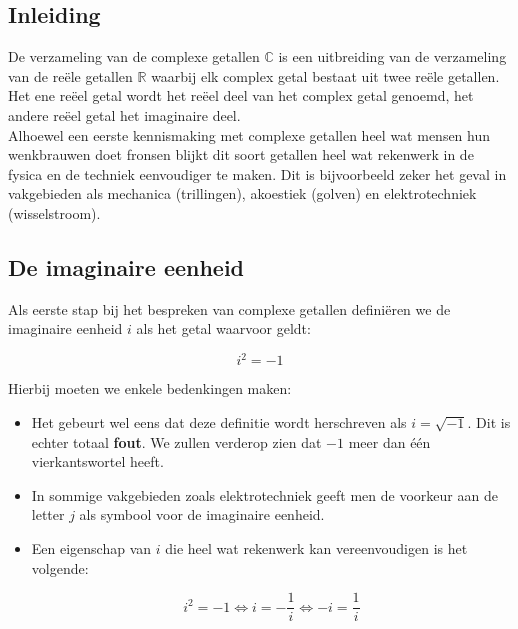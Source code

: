 
\subsection*{Inleiding}

De verzameling van de complexe getallen $\mathbb{C}$ is een uitbreiding van de verzameling van de re\"{e}le getallen $\mathbb{R}$ waarbij elk complex getal bestaat uit twee re\"{e}le getallen. Het ene re\"{e}el getal wordt het re\"{e}el deel van het complex getal genoemd, het andere re\"{e}el getal het imaginaire deel.\\ 
Alhoewel een eerste kennismaking met complexe getallen heel wat mensen hun wenkbrauwen doet fronsen blijkt dit soort getallen heel wat rekenwerk in de fysica en de techniek eenvoudiger te maken. Dit is bijvoorbeeld zeker het geval in vakgebieden als mechanica (trillingen), akoestiek (golven) en elektrotechniek (wisselstroom).\\

\subsection{De imaginaire eenheid}

\begin{definitie}
	Als eerste stap bij het bespreken van complexe getallen defini\"{e}ren we de imaginaire eenheid $i$ als het getal waarvoor geldt:

\[
i^2 =-1 
\]
\end{definitie}

\begin{opmerking}
	Hierbij moeten we enkele bedenkingen maken:\\
\begin{itemize}
\item Het gebeurt wel eens dat deze definitie wordt herschreven als $i=\sqrt{-1}$. Dit is echter totaal {\bf fout}. We zullen verderop zien dat $-1$ meer dan \'{e}\'{e}n vierkantswortel heeft.
\item In sommige vakgebieden zoals elektrotechniek geeft men de voorkeur aan de letter $j$ als symbool voor de imaginaire eenheid.
\item Een eigenschap van $i$ die heel wat rekenwerk kan vereenvoudigen is het volgende:
\begin{eigenschap}
\begin{equation*}
 i^2=-1 \iff  i=-\frac{1}{i} \iff -i=\frac{1}{i} 
\end{equation*}
\end{eigenschap}

\end{itemize}
\end{opmerking}
